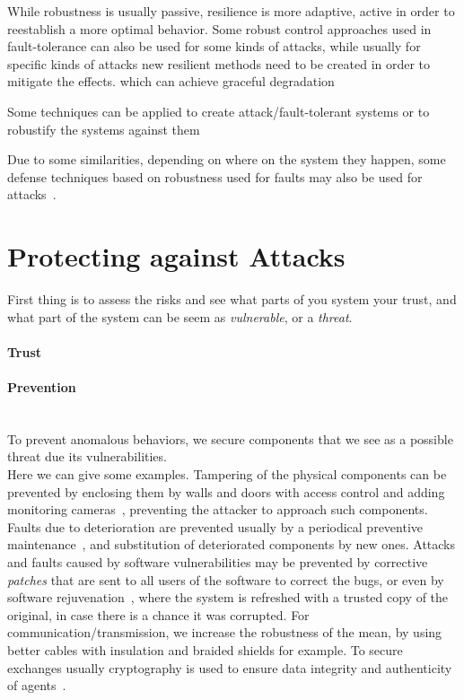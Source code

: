 \documentclass[../main.tex]{subfiles}
\begin{document}
While robustness is usually passive, resilience is more adaptive, active in order to reestablish a more optimal behavior.
Some robust control approaches used in fault-tolerance can also be used for some kinds of attacks, while usually for specific kinds of attacks new resilient methods need to be created in order to mitigate the effects.
which can achieve graceful degradation


Some techniques can be applied to create attack/fault-tolerant systems or to robustify the systems against them\cite{DingEtAl2018,SatchidanandanKumar2017}

Due to some similarities, depending on where on the system they happen, some defense techniques based on robustness used for faults may also be used for attacks~\cite{TeixeiraEtAl2015}.



\section{Protecting against Attacks}\label{sec:protecting_against_attacks}
First thing is to assess the risks and see what parts of you system your trust, and what part of the system can be seem as \emph{vulnerable}, or a \emph{threat}.


\paragraph{Trust}

\paragraph{Prevention}
~\\To prevent anomalous behaviors, we secure components that we see as a possible threat due its vulnerabilities.
\\Here we can give some examples.
Tampering of the physical components can be prevented by enclosing them by walls and doors with access control and adding monitoring cameras~\cite{CardenasEtAl2008,DingEtAl2018}, preventing the attacker to approach such components.
Faults due to deterioration are prevented usually by a periodical preventive maintenance~\cite{ChenEtAl2021}, and substitution of deteriorated components by new ones.
Attacks and faults caused by software vulnerabilities may be prevented by corrective \emph{patches} that are sent to all users of the software to correct the bugs, or even by software rejuvenation~\cite{GriffioenEtAl2020}, where the system is refreshed with a trusted copy of the original, in case there is a chance it was corrupted.
For communication/transmission, we increase the robustness of the mean, by using better cables with insulation and braided shields for example.
To secure exchanges usually cryptography is used to ensure data integrity and authenticity of agents~\cite{DingEtAl2018}.
\end{document}
